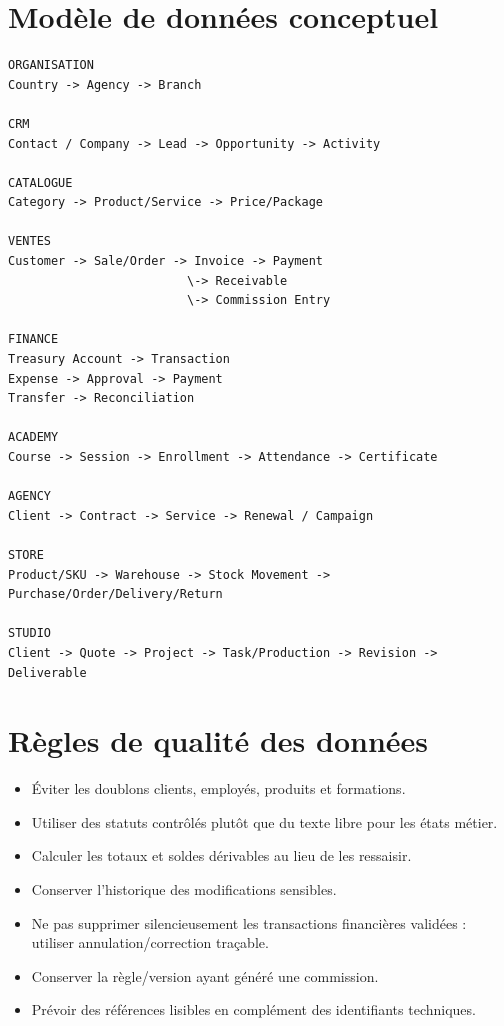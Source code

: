 \documentclass[11pt,a4paper]{article}
\begin{document}
\section{Modèle de données conceptuel}

\begin{verbatim}
ORGANISATION
Country -> Agency -> Branch

CRM
Contact / Company -> Lead -> Opportunity -> Activity

CATALOGUE
Category -> Product/Service -> Price/Package

VENTES
Customer -> Sale/Order -> Invoice -> Payment
                         \-> Receivable
                         \-> Commission Entry

FINANCE
Treasury Account -> Transaction
Expense -> Approval -> Payment
Transfer -> Reconciliation

ACADEMY
Course -> Session -> Enrollment -> Attendance -> Certificate

AGENCY
Client -> Contract -> Service -> Renewal / Campaign

STORE
Product/SKU -> Warehouse -> Stock Movement -> Purchase/Order/Delivery/Return

STUDIO
Client -> Quote -> Project -> Task/Production -> Revision -> Deliverable
\end{verbatim}

\section{Règles de qualité des données}

\begin{itemize}
  \item Éviter les doublons clients, employés, produits et formations.
  \item Utiliser des statuts contrôlés plutôt que du texte libre pour les états métier.
  \item Calculer les totaux et soldes dérivables au lieu de les ressaisir.
  \item Conserver l'historique des modifications sensibles.
  \item Ne pas supprimer silencieusement les transactions financières validées : utiliser annulation/correction traçable.
  \item Conserver la règle/version ayant généré une commission.
  \item Prévoir des références lisibles en complément des identifiants techniques.
\end{itemize}
\end{document}
